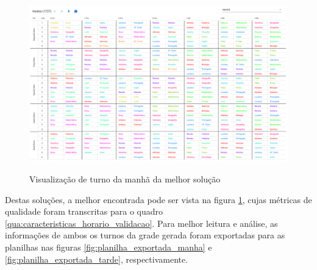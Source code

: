 \begin{figure}[p]
	\centering
	\caption{Visualização de turno da manhã da melhor solução}
	\includegraphics[width=1\textwidth]{./dados/figuras/horario_exportado_manha}
	\label{fig:horario_exportado_manha}
\end{figure}

Destas soluções, a melhor encontrada pode ser vista na figura \ref{fig:horario_exportado_manha}, cujas métricas de qualidade foram transcritas para o quadro \ref{qua:caracteristicas_horario_validacao}. Para melhor leitura e análise, as informações de ambos os turnos da grade gerada foram exportadas para as planilhas nas figuras \ref{fig:planilha_exportada_manha} e \ref{fig:planilha_exportada_tarde}, respectivamente.

